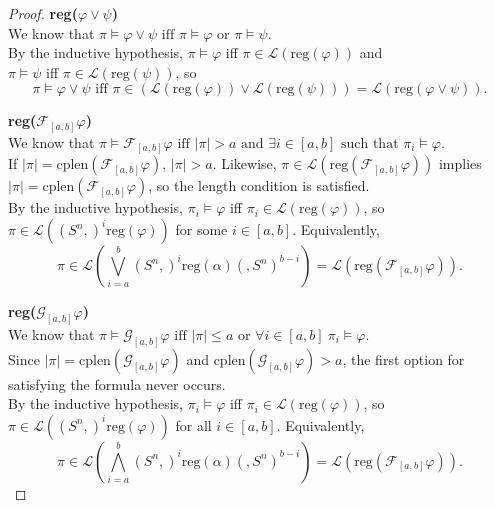 \documentclass[runningheads]{llncs}
\begin{document}
\begin{proof}
 \noindent \textbf{reg($\varphi \lor \psi$)}\\
 We know that $\pi \vDash \varphi \lor \psi \text{ iff } \pi \vDash \varphi \text{ or } \pi \vDash \psi$.\\
 By the inductive hypothesis, $\pi \vDash \varphi$ iff $\pi \in \mathscr{L}(\text{reg}(\varphi))$ and 
 \\$\pi \vDash \psi$ iff $\pi \in \mathscr{L}(\text{reg}(\psi))$, so
 $$\pi \vDash \varphi \lor \psi \text{ iff } \pi \in (\mathscr{L}(\text{reg}(\varphi)) \lor \mathscr{L}(\text{reg}(\psi))) = \mathscr{L}(\text{reg}(\varphi \lor \psi)).$$
 
 \noindent \textbf{reg($\mathcal{F}_{[a,b]} \varphi$)}\\
 We know that $\pi \vDash \mathcal{F}_{[a,b]} \varphi \text{ iff } |\pi| > a \text{ and } \exists i \in [a,b] \text{ such that } \pi_i \vDash \varphi$.\\
 If $|\pi| = \text{cplen}(\mathcal{F}_{[a,b]} \varphi)$, $|\pi| > a$. Likewise, $\pi \in \mathscr{L}\left(\text{reg}\left(\mathcal{F}_{[a,b]} \varphi \right)\right)$ implies $|\pi| = \text{cplen}(\mathcal{F}_{[a,b]} \varphi)$, so the length condition is satisfied.\\
 By the inductive hypothesis, $\pi_i \vDash \varphi$ iff $\pi_i \in \mathscr{L}(\text{reg}(\varphi))$, so $\pi \in \mathscr{L}((S^n,)^i \text{reg}(\varphi))$ for some $i \in [a,b]$. Equivalently, 
 $$\pi \in \mathscr{L}\left(\bigvee_{i=a}^{b} (S^n,)^i \text{reg}(\alpha)(,S^n)^{b-i}\right) = \mathscr{L}(\text{reg}(\mathcal{F}_{[a,b]}\varphi)).$$

 \noindent \textbf{reg($\mathcal{G}_{[a,b]} \varphi$)}\\
 We know that $\pi \vDash \mathcal{G}_{[a,b]}\varphi \text{ iff } |\pi| \leq a \text{ or } \forall i \in [a,b] \ \pi_i \vDash \varphi$.\\
 Since $|\pi| = \text{cplen}(\mathcal{G}_{[a,b]} \varphi)$ and $\text{cplen}(\mathcal{G}_{[a,b]} \varphi) > a$, the first option for satisfying the formula never occurs.\\
 By the inductive hypothesis, $\pi_i \vDash \varphi$ iff $\pi_i \in \mathscr{L}(\text{reg}(\varphi))$, so $\pi \in \mathscr{L}((S^n,)^i \text{reg}(\varphi))$ for all $i \in [a,b]$. Equivalently, 
 $$\pi \in \mathscr{L}\left(\bigwedge_{i=a}^{b} (S^n,)^i \text{reg}(\alpha)(,S^n)^{b-i}\right) = \mathscr{L}(\text{reg}(\mathcal{F}_{[a,b]}\varphi)).$$
 

\end{proof}
\end{document}
